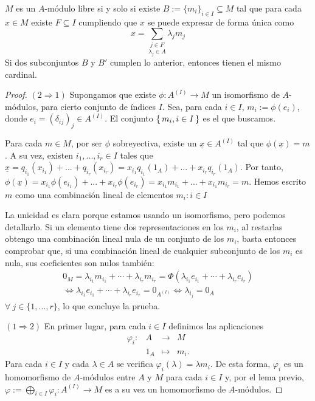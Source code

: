 \documentclass[../main.tex]{subfiles}
\begin{document}
\begin{proposition} $M$ es un $A$-módulo libre si y solo si existe $B:={\{m_i\}}_{i\in I}\subseteq M$ tal que para cada $x\in M$ existe $F\subseteq I$ cumpliendo que $x$ se puede expresar de forma única como$$x=\underset{\lambda_j\in A}{\sum_{j\in F}}\lambda_j m_j$$ Si dos subconjuntos $B$ y $B'$ cumplen lo anterior, entonces tienen el mismo cardinal.
\end{proposition}
\begin{proof}
$(2\Rightarrow 1)$ Supongamos que existe $\phi: A^{(I)}\rightarrow M$ un isomorfismo de $A$-módulos, para cierto conjunto de índices $I$. Sea, para cada $i\in I$, $m_i:=\phi(e_i)$, donde $e_i = (\delta_{ij})_j\in A^{(I)}$. El conjunto $\set{m_i,i\in I}$ es el que buscamos.

Para cada $m\in M$, por ser $\phi$ sobreyectiva, existe un $\underline{x}\in A^{(I)}$ tal que $\phi(\underline{x})=m$. A su vez, existen $i_1,...,i_r\in I$ tales que $\underline{x}=q_{i_1}(x_{i_1})+...+q_{i_r}(x_{i_r})=x_{i_1}q_{i_1}(1_A)+...+x_{i_r}q_{i_r}(1_A)$. Por tanto, $\phi(\underline{x})=x_{i_1}\phi(e_{i_1})+...+x_{i_r}\phi(e_{i_r})=x_{i_1}m_{i_1}+...+x_{i_1}m_{i_r}=m$. Hemos escrito $m$ como una combinación lineal de elementos ${m_i:i\in I}$

La unicidad es clara porque estamos usando un isomorfismo, pero podemos detallarlo. Si un elemento tiene dos representaciones en los $m_i$, al restarlas obtengo una combinación lineal nula de un conjunto de los $m_i$, basta entonces comprobar que, si una combinación lineal de cualquier subconjunto de los $m_i$ es nula, sus coeficientes son nulos también:
\begin{multline}
  0_M = \lambda_{i_1}m_{i_1}+\cdots+\lambda_{i_r}m_{i_r} = \Phi(\lambda_{i_1}e_{i_1}+\cdots+\lambda_{i_r}e_{i_r}) \\
  \Longleftrightarrow \lambda_{i_1}e_{i_1}+\cdots+\lambda_{i_r}e_{i_r}=0_{A^{(I)}}\Longleftrightarrow\lambda_{i_j}=0_A
\end{multline}
$\forall\ j\in\{1,\dots,r\}$, lo que concluye la prueba.

$(1\Rightarrow 2)$ En primer lugar, para cada $i\in I$ definimos las aplicaciones
$$\begin{array}{rccl}
    \varphi_i:&A&\longrightarrow&M\\
    &1_A&\longmapsto&m_i.
\end{array}$$
Para cada $i\in I$ y cada $\lambda\in A$ se verifica $\varphi_i(\lambda)=\lambda m_i$.
De esta forma, $\varphi_i$ es un homomorfismo de $A$-módulos entre $A$ y $M$ para cada $i\in I$ y, por el lema previo, $\varphi:=\bigoplus_{i\in I}\varphi_i: A^{(I)}\longrightarrow M$ es a su vez un homomorfismo de $A$-módulos.


\end{proof}
\end{document}
